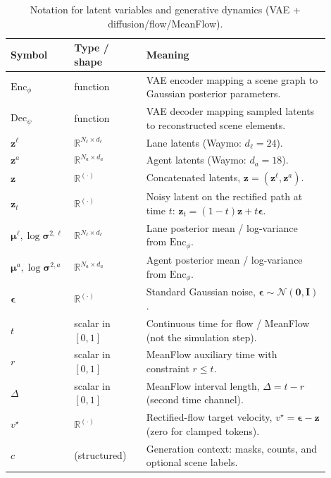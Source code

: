 \documentclass{article}
\newcommand{\Enc}{\mathrm{Enc}}
\newcommand{\Dec}{\mathrm{Dec}}
\theoremstyle{plain}
\theoremstyle{definition}
\theoremstyle{remark}
\begin{document}
\begin{table}[t]
\centering
\small
\caption{Notation for latent variables and generative dynamics (VAE + diffusion/flow/MeanFlow).}
\label{tab:app-notation-latents}
\begin{tabular}{p{0.12\linewidth}p{0.22\linewidth}p{0.56\linewidth}}
\toprule
Symbol & Type / shape & Meaning \\
\midrule
\(\Enc_{\phi}\) & function & VAE encoder mapping a scene graph to Gaussian posterior parameters. \\
\(\Dec_{\psi}\) & function & VAE decoder mapping sampled latents to reconstructed scene elements. \\
\(\mathbf{z}^{\ell}\) & \(\mathbb{R}^{N_{\ell}\times d_{\ell}}\) & Lane latents (Waymo: \(d_{\ell}{=}24\)). \\
\(\mathbf{z}^{a}\) & \(\mathbb{R}^{N_{a}\times d_{a}}\) & Agent latents (Waymo: \(d_{a}{=}18\)). \\
\(\mathbf{z}\) & \(\mathbb{R}^{(\cdot)}\) & Concatenated latents, \(\mathbf{z}=(\mathbf{z}^{\ell},\mathbf{z}^{a})\). \\
\(\mathbf{z}_t\) & \(\mathbb{R}^{(\cdot)}\) & Noisy latent on the rectified path at time \(t\): \(\mathbf{z}_t=(1-t)\mathbf{z}+t\boldsymbol{\epsilon}\). \\
\(\boldsymbol{\mu}^{\ell}, \log\boldsymbol{\sigma}^{2,\ell}\) & \(\mathbb{R}^{N_{\ell}\times d_{\ell}}\) & Lane posterior mean / log-variance from \(\Enc_{\phi}\). \\
\(\boldsymbol{\mu}^{a}, \log\boldsymbol{\sigma}^{2,a}\) & \(\mathbb{R}^{N_{a}\times d_{a}}\) & Agent posterior mean / log-variance from \(\Enc_{\phi}\). \\
\(\boldsymbol{\epsilon}\) & \(\mathbb{R}^{(\cdot)}\) & Standard Gaussian noise, \(\boldsymbol{\epsilon}\sim\mathcal{N}(\mathbf{0},\mathbf{I})\). \\
\(t\) & scalar in \([0,1]\) & Continuous time for flow / MeanFlow (not the simulation step). \\
\(r\) & scalar in \([0,1]\) & MeanFlow auxiliary time with constraint \(r\le t\). \\
\(\Delta\) & scalar in \([0,1]\) & MeanFlow interval length, \(\Delta=t-r\) (second time channel). \\
\(v^\star\) & \(\mathbb{R}^{(\cdot)}\) & Rectified-flow target velocity, \(v^\star=\boldsymbol{\epsilon}-\mathbf{z}\) (zero for clamped tokens). \\
\(c\) & (structured) & Generation context: masks, counts, and optional scene labels. \\

\end{tabular}
\end{table}
\end{document}
